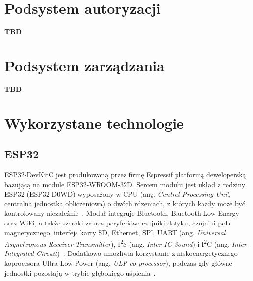     \section{Podsystem autoryzacji}
        \textbf{TBD}

    \section{Podsystem zarządzania}
        \textbf{TBD}

    \section {Wykorzystane technologie}

        \subsection{ESP32}

            ESP32-DevKitC jest produkowaną przez firmę Espressif platformą deweloperską bazującą na module ESP32-WROOM-32D. Sercem modułu jest układ z rodziny ESP32 (ESP32-D0WD) wyposażony w CPU (ang. \textit{Central Processing Unit}, centralna jednostka obliczeniowa) o dwóch rdzeniach, z których każdy może być kontrolowany niezależnie~\cite{esp32-wroom32-ds}. Moduł integruje Bluetooth, Bluetooth Low Energy oraz WiFi, a także szeroki zakres peryferiów: czujniki dotyku, czujniki pola magnetycznego, interfejs karty SD, Ethernet, SPI, UART (ang. \textit{Universal Asynchronous Receiver-Transmitter}), I\textsuperscript{2}S (ang. \textit{Inter-IC Sound}) i I\textsuperscript{2}C (ang. \textit{Inter-Integrated Circuit})~\cite{esp32-wroom32-ds}. Dodatkowo umożliwia korzystanie z niskoenergetycznego koprocesora Ultra-Low-Power (ang. \textit{ULP co-processor}), podczas gdy główne jednostki pozostają w trybie głębokiego uśpienia~\cite{esp32-tech-ref-man}.


